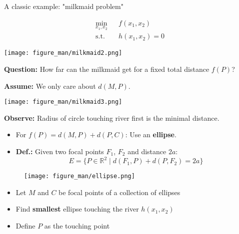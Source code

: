 \documentclass[11pt,compress,t,notes=noshow, xcolor=table]{beamer}
\begin{document}
\begin{vbframe}{A classic example: "milkmaid problem"}
\vspace{-\baselineskip}

\begin{eqnarray*}
	\min_{x_1, x_2} && f(x_1, x_2) \\
	\text{s.t.} && h(x_1, x_2) = 0
\end{eqnarray*}

\medskip

\begin{center}
	\texttt{[image: figure\_man/milkmaid2.png]}
\end{center}

\framebreak 

\textbf{Question:} How far can the milkmaid get for a fixed total distance $f(P)$?

\medskip

\textbf{Assume:} We only care about $d(M,P)$.

\begin{center}
	\texttt{[image: figure\_man/milkmaid3.png]}
\end{center}

\textbf{Observe:} Radius of circle touching river first is the minimal distance.

\framebreak 

\begin{itemize}
    \item For $f(P) = d(M,P) + d(P,C)$: Use an \textbf{ellipse}.
    \item \textbf{Def.:} Given two focal points $F_1$, $F_2$ and distance $2a$:
        \begin{equation*}
            E = \{ P \in \mathbb{R}^2 \;|\; d(F_1,P) + d(P,F_2) = 2a \}
        \end{equation*}
\end{itemize}

\medskip

\begin{figure}
    \centering
	\texttt{[image: figure\_man/ellipse.png]}
\end{figure}

\framebreak 


\begin{itemize}
    \item Let $M$ and $C$ be focal points of a collection of ellipses
    \item Find \textbf{smallest} ellipse touching the river $h(x_1, x_2)$
    \item Define $P$ as the touching point
\end{itemize}


\end{vbframe}
\end{document}
